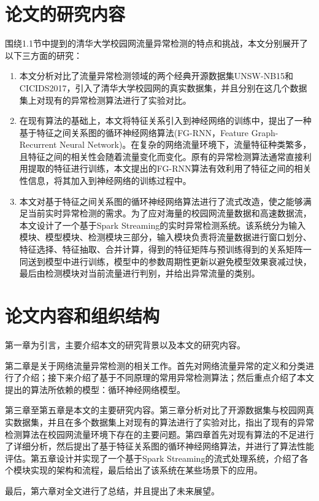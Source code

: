 \section{论文的研究内容}
围绕1.1节中提到的清华大学校园网流量异常检测的特点和挑战，本文分别展开了以下三方面的研究：
\begin{enumerate}
  \item 本文分析对比了流量异常检测领域的两个经典开源数据集UNSW-NB15和CICIDS2017，引入了清华大学校园网的真实数据集，并且分别在这几个数据集上对现有的异常检测算法进行了实验对比。
    \item 在现有算法的基础上，本文将特征关系引入到神经网络的训练中，提出了一种基于特征之间关系图的循环神经网络算法(FG-RNN，Feature Graph-Recurrent Neural Network)。在复杂的网络流量环境下，流量特征种类繁多，且特征之间的相关性会随着流量变化而变化。原有的异常检测算法通常直接利用提取的特征进行训练，本文提出的FG-RNN算法有效利用了特征之间的相关性信息，将其加入到神经网络的训练过程中。
    \item 本文对基于特征之间关系图的循环神经网络算法进行了流式改造，使之能够满足当前实时异常检测的需求。为了应对海量的校园网流量数据和高速数据流，本文设计了一个基于Spark Streaming的实时异常检测系统。该系统分为输入模块、模型模块、检测模块三部分，输入模块负责将流量数据进行窗口划分、特征选择、特征抽取、合并计算，得到的特征矩阵与预训练得到的关系矩阵一同送到模型中进行训练，模型中的参数周期性更新以避免模型效果衰减过快，最后由检测模块对当前流量进行判别，并给出异常流量的类别。

\end{enumerate}

\section{论文内容和组织结构}
第一章为引言，主要介绍本文的研究背景以及本文的研究内容。

第二章是关于网络流量异常检测的相关工作。首先对网络流量异常的定义和分类进行了介绍；接下来介绍了基于不同原理的常用异常检测算法；然后重点介绍了本文提出的算法所依赖的模型：循环神经网络模型。

第三章至第五章是本文的主要研究内容。第三章分析对比了开源数据集与校园网真实数据集，并且在多个数据集上对现有的算法进行了实验对比，指出了现有的异常检测算法在校园网流量环境下存在的主要问题。第四章首先对现有算法的不足进行了详细分析，然后提出了基于特征关系图的循环神经网络算法，并进行了算法性能评估。第五章设计并实现了一个基于Spark Streaming的流式处理系统，介绍了各个模块实现的架构和流程，最后给出了该系统在某些场景下的应用。

最后，第六章对全文进行了总结，并且提出了未来展望。
